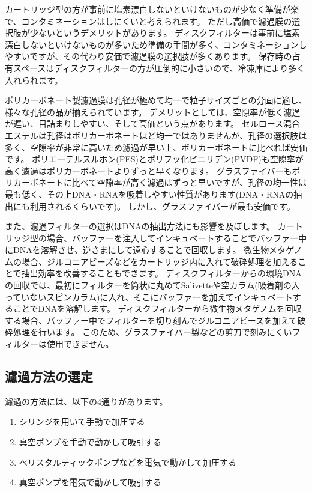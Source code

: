 \documentclass[titlepage,10pt,a4paper,uplatex]{jsbook}
\begin{document}
カートリッジ型の方が事前に塩素漂白しないといけないものが少なく準備が楽で、コンタミネーションはしにくいと考えられます。
ただし高価で濾過膜の選択肢が少ないというデメリットがあります。
ディスクフィルターは事前に塩素漂白しないといけないものが多いため準備の手間が多く、コンタミネーションしやすいですが、その代わり安価で濾過膜の選択肢が多くあります。
保存時の占有スペースはディスクフィルターの方が圧倒的に小さいので、冷凍庫により多く入れられます。

ポリカーボネート製濾過膜は孔径が極めて均一で粒子サイズごとの分画に適し、様々な孔径の品が揃えられています。
デメリットとしては、空隙率が低く濾過が遅い、目詰まりしやすい、そして高価という点があります。
セルロース混合エステルは孔径はポリカーボネートほど均一ではありませんが、孔径の選択肢は多く、空隙率が非常に高いため濾過が早い上、ポリカーボネートに比べれば安価です。
ポリエーテルスルホン(PES)とポリフッ化ビニリデン(PVDF)も空隙率が高く濾過はポリカーボネートよりずっと早くなります。
グラスファイバーもポリカーボネートに比べて空隙率が高く濾過はずっと早いですが、孔径の均一性は最も低く、その上DNA・RNAを吸着しやすい性質があります(DNA・RNAの抽出にも利用されるくらいです)。
しかし、グラスファイバーが最も安価です。

また、濾過フィルターの選択はDNAの抽出方法にも影響を及ぼします。
カートリッジ型の場合、バッファーを注入してインキュベートすることでバッファー中にDNAを溶解させ、逆さまにして遠心することで回収します\citep{Miya2016}。
微生物メタゲノムの場合、ジルコニアビーズなどをカートリッジ内に入れて破砕処理を加えることで抽出効率を改善することもできます\citep{Ushio2019}。
ディスクフィルターからの環境DNAの回収では、最初にフィルターを筒状に丸めてSalivetteや空カラム(吸着剤の入っていないスピンカラム)に入れ、そこにバッファーを加えてインキュベートすることでDNAを溶解します。
ディスクフィルターから微生物メタゲノムを回収する場合、バッファー中でフィルターを切り刻んでジルコニアビーズを加えて破砕処理を行います。
このため、グラスファイバー製などの剪刀で刻みにくいフィルターは使用できません。

\subsection{濾過方法の選定}

濾過の方法には、以下の4通りがあります。

\begin{enumerate}
\item シリンジを用いて手動で加圧する
\item 真空ポンプを手動で動かして吸引する
\item ペリスタルティックポンプなどを電気で動かして加圧する
\item 真空ポンプを電気で動かして吸引する
\end{enumerate}
\end{document}
